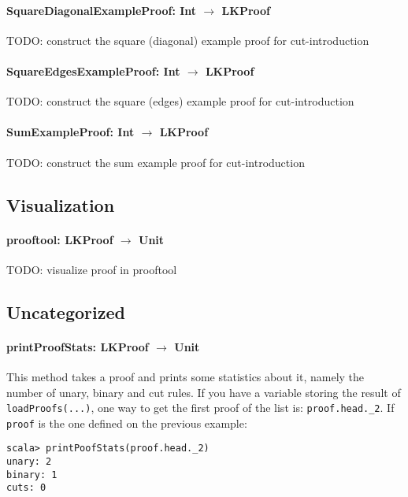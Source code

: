 \documentclass[a4paper, 11pt]{report}
\begin{document}
\paragraph{\textbf{SquareDiagonalExampleProof: Int $\rightarrow$ LKProof}}
{\color{red}TODO}: construct the square (diagonal) example proof for cut-introduction

\paragraph{\textbf{SquareEdgesExampleProof: Int $\rightarrow$ LKProof}}
{\color{red}TODO}: construct the square (edges) example proof for cut-introduction

\paragraph{\textbf{SumExampleProof: Int $\rightarrow$ LKProof}}
{\color{red}TODO}: construct the sum example proof for cut-introduction

\subsection{Visualization}

\paragraph{\textbf{prooftool: LKProof $\rightarrow$ Unit}}
{\color{red}TODO}: visualize proof in prooftool

\subsection{Uncategorized}

\paragraph{\textbf{printProofStats: LKProof $\rightarrow$ Unit}}
This method takes a proof and prints some statistics about it, namely the number
of unary, binary and cut rules. If you have a variable storing the result of 
\texttt{loadProofs(...)}, one way to get the first proof of the list is: 
\texttt{proof.head.\_2}. If \texttt{proof} is the one defined on the previous 
example:

\begin{lstlisting}
scala> printPoofStats(proof.head._2)
unary: 2
binary: 1
cuts: 0
\end{lstlisting}
\end{document}
